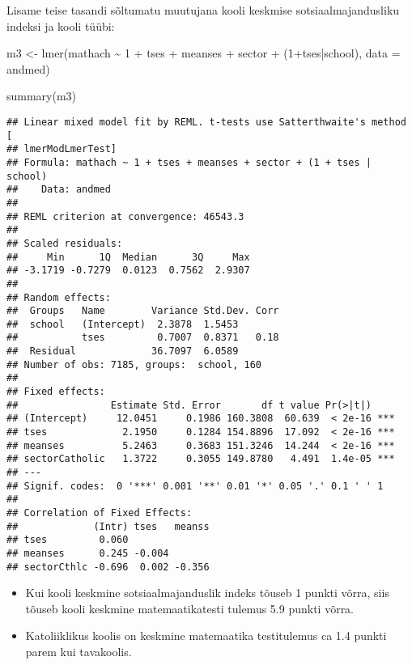 \documentclass[
]{book}
\newenvironment{Shaded}{\begin{snugshade}}{\end{snugshade}}
\newcommand{\AttributeTok}[1]{\textcolor[rgb]{0.77,0.63,0.00}{#1}}
\newcommand{\DecValTok}[1]{\textcolor[rgb]{0.00,0.00,0.81}{#1}}
\newcommand{\FunctionTok}[1]{\textcolor[rgb]{0.00,0.00,0.00}{#1}}
\newcommand{\NormalTok}[1]{#1}
\newcommand{\OtherTok}[1]{\textcolor[rgb]{0.56,0.35,0.01}{#1}}
\newcommand{\SpecialCharTok}[1]{\textcolor[rgb]{0.00,0.00,0.00}{#1}}
\providecommand{\tightlist}{%
  \setlength{\itemsep}{0pt}\setlength{\parskip}{0pt}}
\begin{document}
Lisame teise tasandi sõltumatu muutujana kooli keskmise sotsiaalmajandusliku indeksi ja kooli tüübi:

\begin{Shaded}
\begin{Highlighting}[]
\NormalTok{m3 }\OtherTok{\textless{}{-}} \FunctionTok{lmer}\NormalTok{(mathach }\SpecialCharTok{\textasciitilde{}} \DecValTok{1} \SpecialCharTok{+}\NormalTok{ tses }\SpecialCharTok{+}\NormalTok{ meanses }\SpecialCharTok{+}\NormalTok{ sector }\SpecialCharTok{+}\NormalTok{ (}\DecValTok{1}\SpecialCharTok{+}\NormalTok{tses}\SpecialCharTok{|}\NormalTok{school), }\AttributeTok{data =}\NormalTok{ andmed)}
\end{Highlighting}
\end{Shaded}

\begin{Shaded}
\begin{Highlighting}[]
\FunctionTok{summary}\NormalTok{(m3)}
\end{Highlighting}
\end{Shaded}

\begin{verbatim}
## Linear mixed model fit by REML. t-tests use Satterthwaite's method [
## lmerModLmerTest]
## Formula: mathach ~ 1 + tses + meanses + sector + (1 + tses | school)
##    Data: andmed
## 
## REML criterion at convergence: 46543.3
## 
## Scaled residuals: 
##     Min      1Q  Median      3Q     Max 
## -3.1719 -0.7279  0.0123  0.7562  2.9307 
## 
## Random effects:
##  Groups   Name        Variance Std.Dev. Corr
##  school   (Intercept)  2.3878  1.5453       
##           tses         0.7007  0.8371   0.18
##  Residual             36.7097  6.0589       
## Number of obs: 7185, groups:  school, 160
## 
## Fixed effects:
##                Estimate Std. Error       df t value Pr(>|t|)    
## (Intercept)     12.0451     0.1986 160.3808  60.639  < 2e-16 ***
## tses             2.1950     0.1284 154.8896  17.092  < 2e-16 ***
## meanses          5.2463     0.3683 151.3246  14.244  < 2e-16 ***
## sectorCatholic   1.3722     0.3055 149.8780   4.491  1.4e-05 ***
## ---
## Signif. codes:  0 '***' 0.001 '**' 0.01 '*' 0.05 '.' 0.1 ' ' 1
## 
## Correlation of Fixed Effects:
##             (Intr) tses   meanss
## tses         0.060              
## meanses      0.245 -0.004       
## sectorCthlc -0.696  0.002 -0.356
\end{verbatim}

\begin{itemize}
\tightlist
\item
  Kui kooli keskmine sotsiaalmajanduslik indeks tõuseb 1 punkti võrra, siis tõuseb kooli keskmine matemaatikatesti tulemus 5.9 punkti võrra.\\
\item
  Katoliiklikus koolis on keskmine matemaatika testitulemus ca 1.4 punkti parem kui tavakoolis.
\end{itemize}
\end{document}
